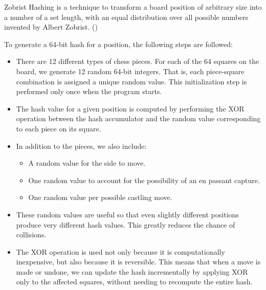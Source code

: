 Zobrist Hashing is a technique to transform a board position of arbitrary size into a number of a set length, with an equal distribution over all possible numbers invented by Albert Zobrist. (\cite{ZobristHashing})

\vspace{1em}

\noindent To generate a 64-bit hash for a position, the following steps are followed:

\begin{itemize}
  \item There are 12 different types of chess pieces. For each of the 64 squares on the board, we generate 12 random 64-bit integers. That is, each piece-square combination is assigned a unique random value. This initialization step is performed only once when the program starts.
  \item The hash value for a given position is computed by performing the XOR operation between the hash accumulator and the random value corresponding to each piece on its square.
  \item In addition to the pieces, we also include:
  \begin{itemize}
    \item A random value for the side to move.
    \item One random value to account for the possibility of an en passant capture.
    \item One random value per possible castling move.
  \end{itemize}
  \item These random values are useful so that even slightly different positions produce very different hash values. This greatly reduces the chance of collisions.
  \item The XOR operation is used not only because it is computationally inexpensive, but also because it is reversible. This means that when a move is made or undone, we can update the hash incrementally by applying XOR only to the affected squares, without needing to recompute the entire hash.
\end{itemize}

